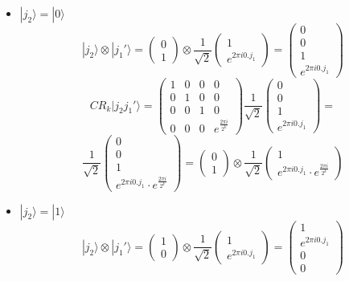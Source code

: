 \begin{itemize}
    \item $|j_2\rangle = |0\rangle$
    \[ |j_2\rangle \otimes |j_1'\rangle = \begin{pmatrix} 0 \\ 1 \end{pmatrix} \otimes \frac{1}{\sqrt{2}}\begin{pmatrix} 1 \\ e^{2 \pi i 0.j_1}\end{pmatrix} = \begin{pmatrix}0 \\ 0 \\ 1 \\  e^{2 \pi i 0.j_1} \end{pmatrix} \]
    \[ CR_k |j_2 j_1'\rangle = \begin{pmatrix} 1 & 0 & 0 & 0 \\ 0 & 1 & 0 & 0 \\ 0 & 0 & 1 & 0 \\ 0 & 0 & 0 & e^{\frac{2 \pi i}{2^k}} \end{pmatrix} \frac{1}{\sqrt{2}}\begin{pmatrix} 0 \\ 0 \\ 1 \\ e^{2 \pi i 0.j_1}\end{pmatrix} = \]
    \[ \frac{1}{\sqrt{2}}\begin{pmatrix} 0 \\ 0 \\ 1 \\ e^{2 \pi i 0.j_1}\cdot e^{\frac{2 \pi i}{2^k}} \end{pmatrix} = \begin{pmatrix} 0 \\ 1 \end{pmatrix} \otimes \frac{1}{\sqrt{2}} \begin{pmatrix} 1 \\ e^{2 \pi i 0.j_1}\cdot e^{\frac{2 \pi i}{2^k}} \end{pmatrix}\]
    \item $|j_2\rangle = |1\rangle$
    \[ |j_2\rangle \otimes |j_1'\rangle = \begin{pmatrix} 1 \\ 0 \end{pmatrix} \otimes \frac{1}{\sqrt{2}}\begin{pmatrix} 1 \\ e^{2 \pi i 0.j_1}\end{pmatrix} = \begin{pmatrix} 1 \\  e^{2 \pi i 0.j_1} \\ 0 \\ 0 \end{pmatrix} \]

\end{itemize}
